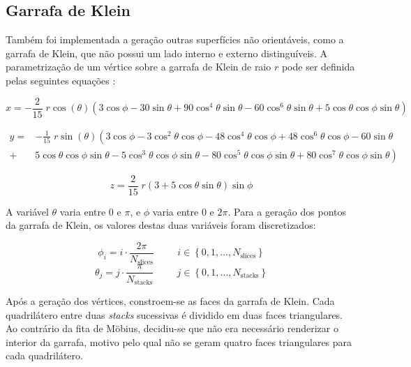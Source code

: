 \documentclass[12pt, a4paper]{article}
\begin{document}
\subsection{Garrafa de Klein}

Também foi implementada a geração outras superfícies não orientáveis, como a garrafa de Klein, que
não possui um lado interno e externo distinguíveis. A parametrização de um vértice sobre a garrafa
de Klein de raio $r$ pode ser definida pelas seguintes equações \cite{klein-bottle}:

$$
x = - \frac{2}{15} \; r \cos(\theta) \left (
        3  \cos \phi -
        30 \sin \theta +
        90 \cos^4 \theta  \sin \theta -
        60 \cos^6 \theta  \sin \theta +
        5  \cos \theta  \cos \phi  \sin \theta
    \right )
$$

\begin{align*}
    y = & - \frac{1}{15} \; r \sin(\theta) \left (
            3 \cos \phi -
            3 \cos^2 \theta  \cos \phi -
            48 \cos^4 \theta  \cos \phi +
            48 \cos^6 \theta  \cos \phi -
            60 \sin \theta
        \right .
    \\
    + & \left .
            5 \cos \theta  \cos \phi  \sin \theta -
            5 \cos^3 \theta  \cos \phi  \sin \theta -
            80 \cos^5 \theta  \cos \phi  \sin \theta +
            80 \cos^7 \theta  \cos \phi  \sin \theta
    \right)
\end{align*}

$$
z = \frac{2}{15} \; r (3 + 5 \cos \theta \sin \theta) \sin \phi
$$

A variável $\theta$ varia entre $0$ e $\pi$, e $\phi$ varia entre $0$ e $2\pi$. Para a geração dos
pontos da garrafa de Klein, os valores destas duas variáveis foram discretizados:

$$
\phi_i = i \cdot \frac{2\pi}{N_\text{slices}}
\hspace{1cm}
i \in \left \lbrace 0, 1, \ldots, N_\text{slices} \right \rbrace
$$
$$
\theta_j = j \cdot \frac{\pi}{N_\text{stacks}}
\hspace{1cm}
j \in \left \lbrace 0, 1, \ldots, N_\text{stacks} \right \rbrace
$$

Após a geração dos vértices, constroem-se as faces da garrafa de Klein. Cada quadrilátero entre duas
\emph{stacks} sucessivas é dividido em duas faces triangulares. Ao contrário da fita de Möbius,
decidiu-se que não era necessário renderizar o interior da garrafa, motivo pelo qual não se geram
quatro faces triangulares para cada quadrilátero.
\end{document}
